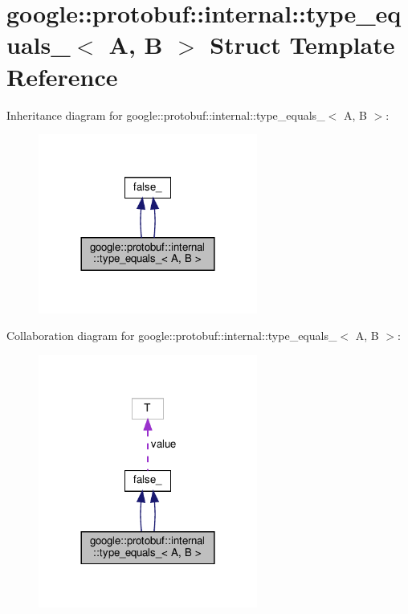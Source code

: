 \hypertarget{structgoogle_1_1protobuf_1_1internal_1_1type__equals__}{}\section{google\+:\+:protobuf\+:\+:internal\+:\+:type\+\_\+equals\+\_\+$<$ A, B $>$ Struct Template Reference}
\label{structgoogle_1_1protobuf_1_1internal_1_1type__equals__}


Inheritance diagram for google\+:\+:protobuf\+:\+:internal\+:\+:type\+\_\+equals\+\_\+$<$ A, B $>$\+:
\nopagebreak
\begin{figure}[H]
\begin{center}
\leavevmode
\includegraphics[width=204pt]{structgoogle_1_1protobuf_1_1internal_1_1type__equals____inherit__graph}
\end{center}
\end{figure}


Collaboration diagram for google\+:\+:protobuf\+:\+:internal\+:\+:type\+\_\+equals\+\_\+$<$ A, B $>$\+:
\nopagebreak
\begin{figure}[H]
\begin{center}
\leavevmode
\includegraphics[width=204pt]{structgoogle_1_1protobuf_1_1internal_1_1type__equals____coll__graph}
\end{center}
\end{figure}
